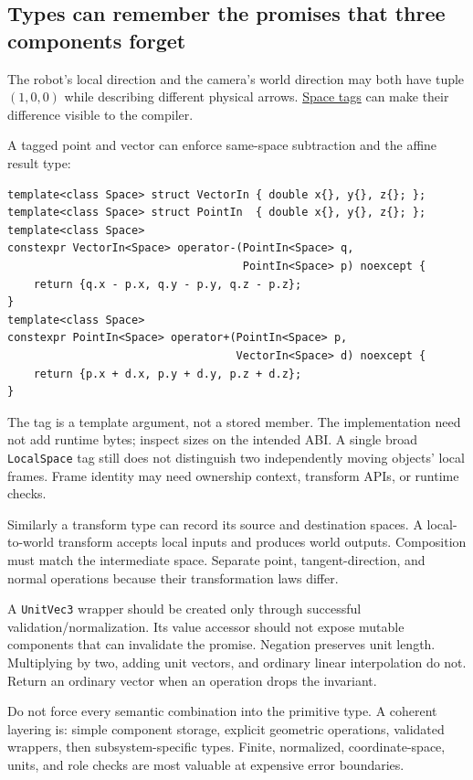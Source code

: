 \subsection{Types can remember the promises that three components forget}\label{types-can-remember-the-promises-that-three-components-forget}

The robot's local direction and the camera's world direction may both have tuple \((1,0,0)\) while describing different physical arrows. \hyperref[02-foundations-ii-ch037]{Space tags} can make their difference visible to the compiler.

A tagged point and vector can enforce same-space subtraction and the affine result type:

\begin{verbatim}
template<class Space> struct VectorIn { double x{}, y{}, z{}; };
template<class Space> struct PointIn  { double x{}, y{}, z{}; };
template<class Space>
constexpr VectorIn<Space> operator-(PointIn<Space> q,
                                    PointIn<Space> p) noexcept {
    return {q.x - p.x, q.y - p.y, q.z - p.z};
}
template<class Space>
constexpr PointIn<Space> operator+(PointIn<Space> p,
                                   VectorIn<Space> d) noexcept {
    return {p.x + d.x, p.y + d.y, p.z + d.z};
}
\end{verbatim}

The tag is a template argument, not a stored member. The implementation need not add runtime bytes; inspect sizes on the intended ABI. A single broad \texttt{LocalSpace} tag still does not distinguish two independently moving objects' local frames. Frame identity may need ownership context, transform APIs, or runtime checks.

Similarly a transform type can record its source and destination spaces. A local-to-world transform accepts local inputs and produces world outputs. Composition must match the intermediate space. Separate point, tangent-direction, and normal operations because their transformation laws differ.

A \texttt{UnitVec3} wrapper should be created only through successful validation/normalization. Its value accessor should not expose mutable components that can invalidate the promise. Negation preserves unit length. Multiplying by two, adding unit vectors, and ordinary linear interpolation do not. Return an ordinary vector when an operation drops the invariant.

Do not force every semantic combination into the primitive type. A coherent layering is: simple component storage, explicit geometric operations, validated wrappers, then subsystem-specific types. Finite, normalized, coordinate-space, units, and role checks are most valuable at expensive error boundaries.

